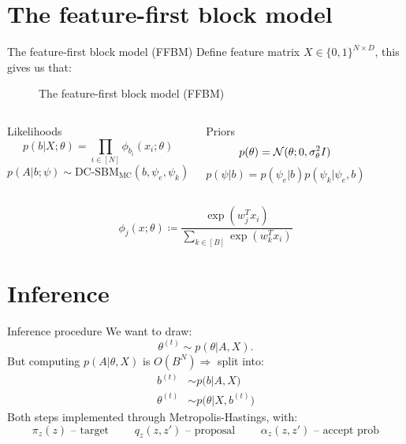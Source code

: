 \documentclass{beamer}
\newcommand{\Gaussian}{\mathcal{N}}
\begin{document}
\section{The feature-first block model}

	\begin{frame}{The feature-first block model (FFBM)}
		Define feature matrix $X \in \{0, 1\}^{N \times D}$, this gives us that:
		\begin{figure}[!h]
			\centering
			\caption{The feature-first block model (FFBM)}
			\label{fig:ffbm}
		\end{figure}
	
		\begin{columns}
			\begin{block}{Likelihoods}
				$$p(b|X; \theta) = \prod_{i \in [N]} \phi_{b_i} (x_i; \theta)$$
				$$p(A|b; \psi) \sim \textrm{DC-SBM}_{\textrm{MC}} (b, \psi_e, \psi_k)$$
			\end{block}
		
			\begin{alertblock}{Priors}
				$$p(\theta) = \Gaussian(\theta;0, \sigma_\theta^2 I)\vspace{4mm}$$
				$$p(\psi | b) = p(\psi_e | b) p(\psi_k | \psi_e, b)$$
			\end{alertblock}
		\end{columns}
	
		\vspace{5mm}
		$$\phi_{j}(x; \theta) \coloneqq \frac{\exp (w_j^T x_i)}{\sum_{k \in [B]} \exp (w_k^T x_i) }$$
	\end{frame}

	\section{Inference}
	\begin{frame}{Inference procedure}
		We want to draw:
		$$\theta^{(t)} \sim p(\theta| A, X).$$
		But computing $p(A| \theta, X)$ is $O(B^N) \Rightarrow$  split into:
		\begin{align*}
			b^{(t)} &\sim p \Big( b| A, X \Big) \\
			\theta^{(t)} &\sim p \Big( \theta| X, b^{(t)} \Big)
		\end{align*}
		Both steps implemented through Metropolis-Hastings, with:
		$$\pi_z(z) \textrm{ -- target } \qquad q_z(z, z') \textrm{ -- proposal } \qquad \alpha_z(z, z') \textrm{ -- accept prob}$$		
	\end{frame}
	
\end{document}
